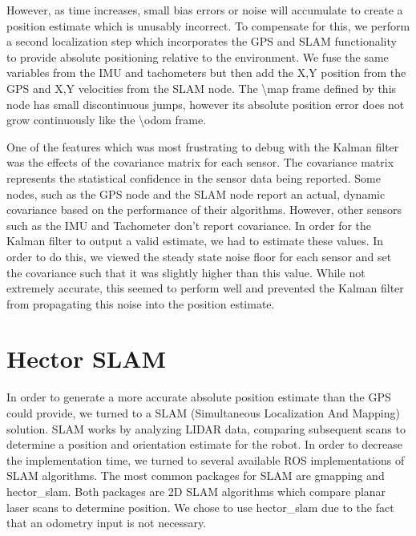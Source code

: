 However, as time increases, small bias errors or noise will accumulate to create a position estimate which is unusably incorrect. To compensate for this, we perform a second localization step which incorporates the GPS and SLAM functionality to provide absolute positioning relative to the environment. We fuse the same variables from the IMU and tachometers but then add the X,Y position from the GPS and X,Y velocities from the SLAM node. The \textbackslash map frame defined by this node has small discontinuous jumps, however its absolute position error does not grow continuously like the \textbackslash odom frame.

One of the features which was most frustrating to debug with the Kalman filter was the effects of the covariance matrix for each sensor. The covariance matrix represents the statistical confidence in the sensor data being reported. Some nodes, such as the GPS node and the SLAM node report an actual, dynamic covariance based on the performance of their algorithms. However, other sensors such as the IMU and Tachometer don't report covariance. In order for the Kalman filter to output a valid estimate, we had to estimate these values. In order to do this, we viewed the steady state noise floor for each sensor and set the covariance such that it was slightly higher than this value. While not extremely accurate, this seemed to perform well and prevented the Kalman filter from propagating this noise into the position estimate.

\section{Hector SLAM}

In order to generate a more accurate absolute position estimate than the GPS could provide, we turned to a SLAM (Simultaneous Localization And Mapping) solution. SLAM works by analyzing LIDAR data, comparing subsequent scans to determine a position and orientation estimate for the robot. In order to decrease the implementation time, we turned to several available ROS implementations of SLAM algorithms. The most common packages for SLAM are gmapping and hector\_slam. Both packages are 2D SLAM algorithms which compare planar laser scans to determine position. We chose to use hector\_slam due to the fact that an odometry input is not necessary.  

